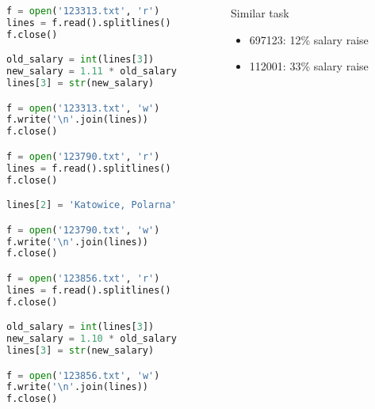 \documentclass[aspectratio=169]{beamer}
\begin{document}
\begin{frame}[fragile]
\begin{columns}
\begin{column}{0.5\textwidth}
\begin{lstlisting}[basicstyle=\tiny,language=python]
f = open('123313.txt', 'r')
lines = f.read().splitlines()
f.close()

old_salary = int(lines[3])
new_salary = 1.11 * old_salary
lines[3] = str(new_salary)

f = open('123313.txt', 'w')
f.write('\n'.join(lines))
f.close()

f = open('123790.txt', 'r')
lines = f.read().splitlines()
f.close()

lines[2] = 'Katowice, Polarna'

f = open('123790.txt', 'w')
f.write('\n'.join(lines))
f.close()

f = open('123856.txt', 'r')
lines = f.read().splitlines()
f.close()

old_salary = int(lines[3])
new_salary = 1.10 * old_salary
lines[3] = str(new_salary)

f = open('123856.txt', 'w')
f.write('\n'.join(lines))
f.close()
\end{lstlisting}
\end{column}
\begin{column}{0.5\textwidth}
Similar task
\begin{itemize}
  \item 697123: 12\% salary raise
  \item 112001: 33\% salary raise
\end{itemize}
\end{column}
\end{columns}
\end{frame}
\end{document}
